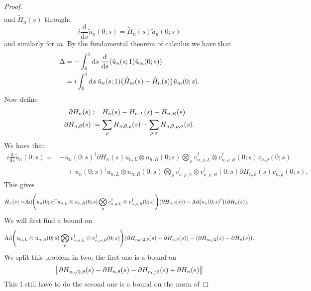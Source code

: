 \documentclass[12pt,a4paper,twoside]{article}
\renewcommand{\d}{\text{d}}
\newcommand{\defeq}{\vcentcolon=}
\let\originalleft\left
\let\originalright\right
\renewcommand{\left}{\mathopen{}\mathclose\bgroup\originalleft}
\renewcommand{\right}{\aftergroup\egroup\originalright}
\newcommand{\Ad}[1]{\textrm{Ad}\left(#1\right)}
\theoremstyle{definition}
\numberwithin{equation}{section}
\begin{document}
\begin{proof}
\begin{align}
 	\end{align}
 	and $\tilde{H}_n(s)$ through:
 	\begin{equation}
	 	i\frac{\d}{\d s}\tilde{u}_n(0;s)=\tilde{H}_n(s)\tilde{u}_n(0;s)
 	\end{equation}
 	and similarly for $m$. By the fundamental theorem of calculus we have that
 	\begin{align}
 		\Delta&=-\int_0^1\d s\:\frac{\d}{\d s}\left(\tilde{u}_n(s;1)\tilde{u}_m(0;s)\right)\\
 		&=i\int_0^1\d s \: \tilde{u}_n(s;1)\left(\tilde{H}_m(s)-\tilde{H}_n(s)\right)\tilde{u}_m(0;s).
 	\end{align}
 	Now define
 	\begin{align}
	 	\partial H_n(s)&\defeq H_n(s)- H_{n,L}(s)-H_{n,R}(s)\\
	 	\partial H_{n,\theta}(s)&\defeq \sum_\rho H_{n,\theta,\rho}(s)-\sum_{\rho,\sigma}H_{n,\theta,\rho,\sigma}(s).
 	\end{align}
 	We have that
 	\begin{align}
	 	i\frac{\d}{\d s}\tilde{u}_n(0;s)=&-u_n(0;s)^\dagger\partial H_n(s)u_{n,L}\otimes u_{n,R}(0;s) \bigotimes_\rho v_{n,\rho,L}^\dagger\otimes v_{n,\rho,R}^\dagger(0;s) v_{n,\rho}(0;s)\\
	 	\nonumber
	 	&\quad + u_n(0;s)^\dagger u_{n,L}\otimes u_{n,R}(0;s) \bigotimes_\rho v_{n,\rho,L}^\dagger\otimes v_{n,\rho,R}^\dagger(0;s) \partial H_{n,\theta}(s) v_{n,\rho}(0;s).
 	\end{align}
 	This gives
 	\begin{align}
	 	\tilde{H}_n(s)=& \Ad{u_n(0;s)^\dagger u_{n,L}\otimes u_{n,R}(0;s) \bigotimes_\rho v_{n,\rho,L}^\dagger\otimes v_{n,\rho,R}^\dagger(0;s)}\left(\partial H_{n,\theta}(s)\right) - \Ad{u_n(0;s)^\dagger}(\partial H_n(s)).
 	\end{align}
 	We will first find a bound on
 	\begin{equation}
 	\Ad{u_{n,L}\otimes u_{n,R}(0;s) \bigotimes_\rho v_{n,\rho,L}^\dagger\otimes v_{n,\rho,R}^\dagger(0;s)}(\partial H_{n_0/2,\theta}(s)-\partial H_{n,\theta}(s))-(\partial H_{n_0/2}(s)-\partial H_{n}(s)).
 	\end{equation}
 	We split this problem in two, the first one is a bound on
 	\begin{equation}
	 	\norm{\partial H_{n_0/2,\theta}(s)-\partial H_{n,\theta}(s)-\partial H_{n_0/2}(s)+\partial H_{n}(s)}
 	\end{equation}
 	{\color{red}This I still have to do }the second one is a bound on the norm of

\end{proof}
\end{document}
